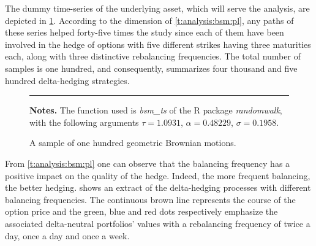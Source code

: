\documentclass[12pt]{report}
\begin{document}
The dummy time-series of the underlying asset, which will serve the analysis, are depicted in \cref{p:analysis:gbm:100}. 
According to the dimension of \cref{t:analysis:bsm:pl}, any paths of these series helped forty-five times the study since each of them have been involved in the hedge of options with five different strikes having three maturities each, along with three distinctive rebalancing frequencies.
The total number of samples is one hundred, and consequently,  summarizes four thousand and five hundred delta-hedging strategies.

\begin{figure}[ht]
  \centering
  \rule{40mm}{20mm}
  \caption{A sample of one hundred geometric Brownian motions.}
  \begin{changemargin}{0.5cm}{0.5cm}
  \medskip
\footnotesize
{}\textbf{Notes.} The function used is \textit{bsm\_ts} of the R package \textit{randomwalk}, with the following arguments $\tau = 1.0931$, $\alpha = 0.48229$, $\sigma = 0.1958$.
  \end{changemargin}
  \label{p:analysis:gbm:100}
\end{figure}



























From \cref{t:analysis:bsm:pl} one can observe that the balancing frequency has a positive impact on the quality of the hedge.
Indeed, the more frequent balancing, the better hedging.
 shows an extract of the delta-hedging processes with different balancing frequencies.
The continuous brown line represents the course of the option price and the green, blue and red dots respectively emphasize the associated delta-neutral portfolios' values with a rebalancing frequency of twice a day, once a day and once a week.
\end{document}
